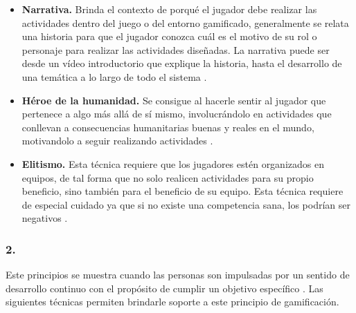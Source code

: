     \begin{itemize}
    \item
    {\bf Narrativa.}
        Brinda el contexto de porqué el jugador debe realizar las actividades dentro del juego o
        del entorno gamificado, generalmente se relata una historia para que el jugador conozca
        cuál es el motivo de su rol o personaje para realizar las actividades diseñadas.
        La narrativa puede ser desde un vídeo introductorio que explique la historia, hasta
        el desarrollo de una temática a lo largo de todo el sistema \cite[p. 81]{Octalysis}.

    \item
    {\bf Héroe de la humanidad.}
        Se consigue al hacerle sentir al jugador que pertenece a algo más allá de sí mismo,
        involucrándolo en actividades que conllevan a consecuencias humanitarias buenas y reales
        en el mundo, motivandolo a seguir realizando actividades \cite[p. 82]{Octalysis}.

    \item
    {\bf Elitismo.}
        Esta técnica requiere que los jugadores estén organizados en equipos, de tal forma que
        no solo realicen actividades para su propio beneficio, sino también para el beneficio
        de su equipo. Esta técnica requiere de especial cuidado ya que si no existe una competencia
        sana, los podrían ser negativos \cite[p. 83]{Octalysis}.

    \end{itemize}

\subsubsection{2. \principioII} \label{subsec:principioII}

 Este principios se muestra cuando las personas son impulsadas por un sentido de desarrollo continuo
 con el propósito de cumplir un objetivo específico \cite[p. 91]{Octalysis}. Las siguientes técnicas
 permiten brindarle soporte a este principio de gamificación.

